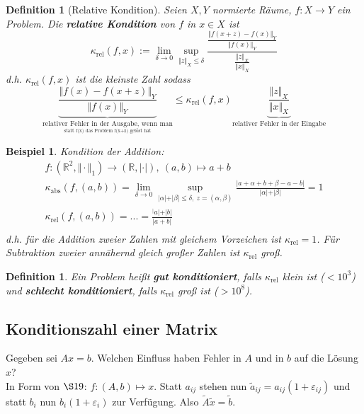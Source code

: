 \documentclass[12pt]{article}
\theoremstyle{break}
\newtheorem{definition}[theorem]{Definition}
\newtheorem{example}[theorem]{Beispiel}
\begin{document}
\begin{definition}[Relative Kondition]
Seien $X, Y$ normierte Räume, $f: X \rightarrow Y$ ein Problem. Die \textbf{relative Kondition} von $f$ in $x \in X$ ist
$$\kappa_{\text{rel}}(f,x) := \lim_{\delta \rightarrow 0} \sup_{\Vert z \Vert_X \leq \delta} \frac{\frac{\Vert f(x+z) - f(x) \Vert_Y}{\Vert f(x) \Vert_Y}}{\frac{\Vert z \Vert_X}{\Vert x \Vert_X}} $$
d.h. $\kappa_{\text{rel}}(f,x)$ ist die kleinste Zahl sodass 
$$\underbrace{\frac{\Vert f(x) - f(x+z) \Vert_Y}{\Vert f(x) \Vert_Y}}_{\underset{\text{statt f(x) das Problem f(x+z) gelöst hat}}{\text{relativer Fehler in der Ausgabe, wenn man}}} \leq \kappa_{\text{rel}}(f,x) \underbrace{\frac{\Vert z \Vert_X}{\Vert x \Vert_X}}_{\text{relativer Fehler in der Eingabe}}$$
\end{definition}

\begin{example}
Kondition der Addition:
\begin{align*}
&f: (\mathbb{R}^2, \Vert \cdot \Vert_1) \rightarrow (\mathbb{R}, \vert \cdot \vert), \medspace (a, b) \mapsto a+b &\\
&\kappa_{\text{abs}}(f,(a,b)) = \lim_{\delta \rightarrow 0} \sup_{\vert \alpha \vert + \vert \beta \vert \leq \delta, \medspace z = (\alpha, \beta)} \frac{\vert a + \alpha + b + \beta - a - b \vert}{\vert \alpha \vert + \vert \beta \vert} = 1 &\\
&\kappa_{\text{rel}}(f,(a,b)) = ... = \frac{^\vert a \vert + \vert b \vert}{\vert a+b \vert} &\\
\end{align*}
d.h. für die Addition zweier Zahlen mit gleichem Vorzeichen ist $\kappa_{\text{rel}} = 1$. Für Subtraktion zweier annähernd gleich großer Zahlen ist $\kappa_{\text{rel}}$ groß.
\end{example}

\begin{definition}
Ein Problem heißt \textbf{gut konditioniert}, falls $\kappa_{\text{rel}}$ klein ist ($< 10^3$) und \textbf{schlecht konditioniert}, falls $\kappa_{\text{rel}}$ groß ist ($>10^8$).
\end{definition}

\subsection{Konditionszahl einer Matrix}
Gegeben sei $Ax = b$. Welchen Einfluss haben Fehler in $A$ und in $b$ auf die Lösung $x$?\\
In Form von $\S 19$: $f: (A, b) \mapsto x$. Statt $a_{ij}$ stehen nun $\tilde{a}_{ij}= a_{ij}(1+ \varepsilon_{ij})$ und statt $b_i$ nun $b_i(1+ \varepsilon_{i})$ zur Verfügung. Also $\tilde{A} \tilde{x} = \tilde{b}$. 
\end{document}

